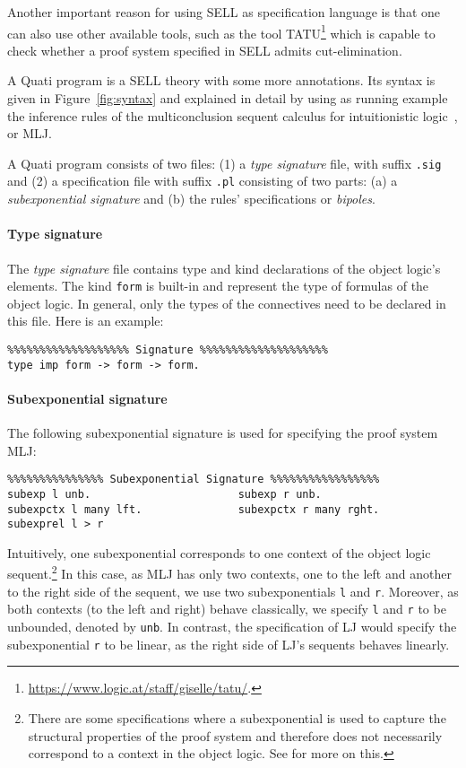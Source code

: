 \documentclass{llncs}
\begin{document}
Another important reason for using SELL as specification language is that one can also use 
other available tools, such as the tool TATU\footnote{\url{https://www.logic.at/staff/giselle/tatu/}.} which is capable to check whether a proof system 
specified in SELL admits cut-elimination.

A Quati program is a SELL theory with some more annotations. Its syntax is given
in Figure~\ref{fig:syntax} and explained in detail  
by using as running example the inference rules of the multiconclusion sequent
calculus for intuitionistic logic~\cite{maehara54nmj}, or MLJ.

A Quati program consists of two files: (1) a \emph{type signature} file, with
suffix \texttt{.sig} and (2) a specification file with suffix \texttt{.pl} consisting of two parts: (a) a
\emph{subexponential signature} and (b) the rules' specifications or
\emph{bipoles}.

\paragraph{Type signature}
%
The \emph{type signature} file contains type and kind declarations of the object
logic's elements. The kind \texttt{form} is built-in and
represent the type of formulas of the object logic. In general, only
the types of the connectives need to be declared in this file. Here is an
example:
\vspace{-1mm}

{\small
\begin{verbatim}
%%%%%%%%%%%%%%%%%%% Signature %%%%%%%%%%%%%%%%%%%%
type imp form -> form -> form.
\end{verbatim}
}

\paragraph{Subexponential signature}
%
The following subexponential signature is used for specifying the proof system MLJ:
\vspace{-1mm}

{\small
\begin{verbatim}
%%%%%%%%%%%%%%% Subexponential Signature %%%%%%%%%%%%%%%%%
subexp l unb.                       subexp r unb.            
subexpctx l many lft.               subexpctx r many rght.
subexprel l > r
\end{verbatim}
}

Intuitively, one subexponential corresponds to one context of the object logic sequent.\footnote{There are 
some specifications where a subexponential is used to capture the structural properties of the proof 
system and therefore does not necessarily correspond to a context in the object logic. See \cite{nigam.jlc}
for more on this.}
In this case, as MLJ has only two
contexts, one to the left and another to the right side of the sequent, we use two subexponentials
\texttt{l} and \texttt{r}. Moreover, as both contexts (to the left and right) behave classically, 
we specify \texttt{l} and \texttt{r} to be unbounded, denoted by \texttt{unb}. In contrast, 
the specification of LJ would specify the subexponential \texttt{r} to be linear, as the right side of LJ's 
sequents behaves linearly.
\end{document}
